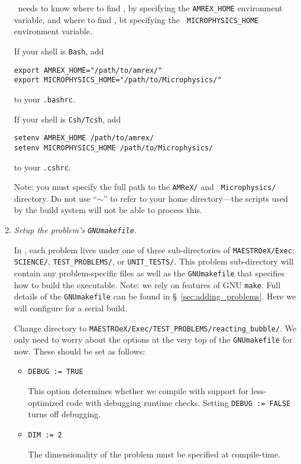 \begin{enumerate}
  \maestroex\ needs to know where to find \amrex, by specifying the
  {\tt AMREX\_HOME} environment variable, and where
  to find \microphysics, bt specifying the {\tt
  MICROPHYSICS\_HOME} environment variable.

  If your shell is {\tt Bash}, add
  \begin{verbatim}
export AMREX_HOME="/path/to/amrex/"
export MICROPHYSICS_HOME="/path/to/Microphysics/"
  \end{verbatim}
  to your {\tt .bashrc}. 

  If your shell is {\tt Csh/Tcsh}, add
  \begin{verbatim}
setenv AMREX_HOME /path/to/amrex/
setenv MICROPHYSICS_HOME /path/to/Microphysics/
  \end{verbatim}
  to your {\tt .cshrc}.  

  Note: you must specify the full path to the {\tt AMReX/} and {\tt
    Microphysics/} directory.  Do not use ``$\sim$'' to refer to your
  home directory---the scripts used by the build system will not be
  able to process this.

\item {\em Setup the problem's {\tt GNUmakefile}}.

  In \maestroex, each problem lives under one of three sub-directories
  of {\tt MAESTROeX/Exec}: {\tt SCIENCE/}, {\tt TEST\_PROBLEMS/}, or
  {\tt UNIT\_TESTS/}.  This problem sub-directory will contain any
  problem-specific files as well as the {\tt GNUmakefile} that
  specifies how to build the executable.  Note: we rely on features of
  GNU {\tt make}.  Full details of the {\tt GNUmakefile} can be found
  in \S~\ref{sec:adding_problems}.  Here we will configure for a
  serial build.

  Change directory to 
  {\tt MAESTROeX/Exec/TEST\_PROBLEMS/reacting\_bubble/}.
  We only need to worry about the options at the very top of the 
  {\tt GNUmakefile} for now.  These should be set as follows:
  \begin{itemize}

  \item {\tt DEBUG := TRUE}

    This option determines whether we compile with support for 
    less-optimized code with debugging runtime checks.  Setting 
    {\tt DEBUG := FALSE} turns off debugging.

  \item {\tt DIM := 2}

    The dimensionality of the problem must be specified at compile-time.


\end{itemize}
\end{enumerate}
